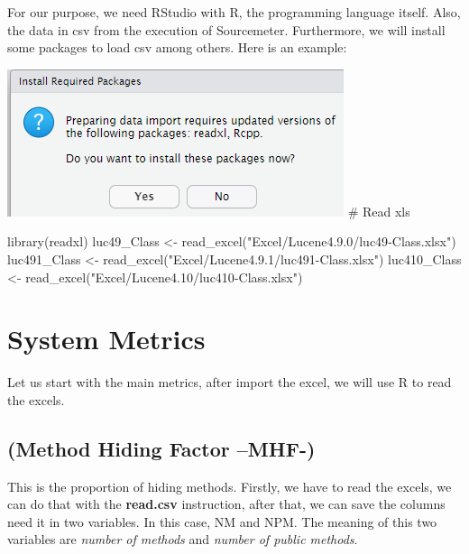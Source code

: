 \documentclass[
]{article}
\newenvironment{Shaded}{\begin{snugshade}}{\end{snugshade}}
\newcommand{\FunctionTok}[1]{\textcolor[rgb]{0.00,0.00,0.00}{#1}}
\newcommand{\NormalTok}[1]{#1}
\newcommand{\OtherTok}[1]{\textcolor[rgb]{0.56,0.35,0.01}{#1}}
\newcommand{\StringTok}[1]{\textcolor[rgb]{0.31,0.60,0.02}{#1}}
\begin{document}
For our purpose, we need RStudio with R, the programming language
itself. Also, the data in csv from the execution of Sourcemeter.
Furthermore, we will install some packages to load csv among others.
Here is an example:

\includegraphics{EXCEL.png} \# Read xls

\begin{Shaded}
\begin{Highlighting}[]
\FunctionTok{library}\NormalTok{(readxl)}
\NormalTok{luc49\_Class }\OtherTok{\textless{}{-}} \FunctionTok{read\_excel}\NormalTok{(}\StringTok{"Excel/Lucene4.9.0/luc49{-}Class.xlsx"}\NormalTok{)}
\NormalTok{luc491\_Class }\OtherTok{\textless{}{-}} \FunctionTok{read\_excel}\NormalTok{(}\StringTok{"Excel/Lucene4.9.1/luc491{-}Class.xlsx"}\NormalTok{)}
\NormalTok{luc410\_Class }\OtherTok{\textless{}{-}} \FunctionTok{read\_excel}\NormalTok{(}\StringTok{"Excel/Lucene4.10/luc410{-}Class.xlsx"}\NormalTok{)}
\end{Highlighting}
\end{Shaded}

\hypertarget{system-metrics}{%
\section{System Metrics}\label{system-metrics}}

Let us start with the main metrics, after import the excel, we will use
R to read the excels.

\hypertarget{method-hiding-factor-mhf-}{%
\subsection{(Method Hiding Factor
--MHF-)}\label{method-hiding-factor-mhf-}}

This is the proportion of hiding methods. Firstly, we have to read the
excels, we can do that with the \textbf{read.csv} instruction, after
that, we can save the columns need it in two variables. In this case, NM
and NPM. The meaning of this two variables are \emph{number of methods}
and \emph{number of public methods}.
\end{document}
